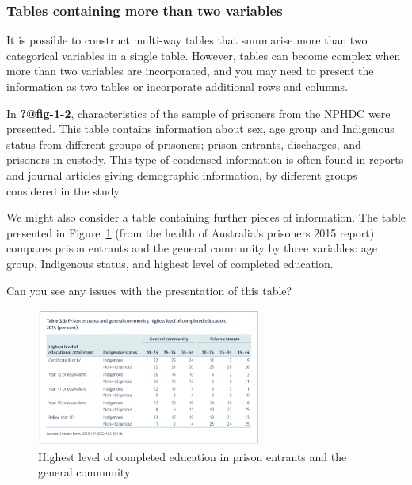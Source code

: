 \documentclass[
  a4paper,
]{memoir}
\begin{document}
\hypertarget{tables-containing-more-than-two-variables}{%
\subsubsection{Tables containing more than two
variables}\label{tables-containing-more-than-two-variables}}

It is possible to construct multi-way tables that summarise more than
two categorical variables in a single table. However, tables can become
complex when more than two variables are incorporated, and you may need
to present the information as two tables or incorporate additional rows
and columns.

In \textbf{?@fig-1-2}, characteristics of the sample of prisoners from
the NPHDC were presented. This table contains information about sex, age
group and Indigenous status from different groups of prisoners; prison
entrants, discharges, and prisoners in custody. This type of condensed
information is often found in reports and journal articles giving
demographic information, by different groups considered in the study.

We might also consider a table containing further pieces of information.
The table presented in Figure~\ref{fig-prison-education} (from the
health of Australia's prisoners 2015 report) compares prison entrants
and the general community by three variables: age group, Indigenous
status, and highest level of completed education.

Can you see any issues with the presentation of this table?

\begin{figure}[H]

{\centering \includegraphics[width=0.66\textwidth,height=\textheight]{img/mod01/prisoner-education.png}

}

\caption{\label{fig-prison-education}Highest level of completed
education in prison entrants and the general community}

\end{figure}
\end{document}
